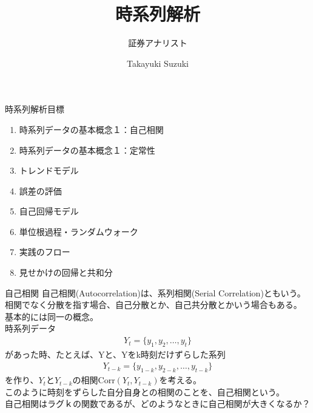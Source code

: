 \documentclass[dvipdfmx,autodetect-engine, unicode, 10pt, aspectratio=169]{beamer}
\title{時系列解析}
\subtitle{証券アナリスト}
\date{}
\author{Takayuki Suzuki}
\institute{This is institude of the author}
\begin{document}
\maketitle


\begin{frame}{時系列解析目標}
    \begin{enumerate}
        \item 時系列データの基本概念１：自己相関
        \item 時系列データの基本概念１：定常性
        \item トレンドモデル
        \item 誤差の評価
        \item 自己回帰モデル
        \item 単位根過程・ランダムウォーク
        \item 実践のフロー
        \item 見せかけの回帰と共和分
    \end{enumerate}
\end{frame}



\begin{frame}{自己相関}
    自己相関(Autocorrelation)は、系列相関(Serial Correlation)ともいう。\\
    相関でなく分散を指す場合、自己分散とか、自己共分散とかいう場合もある。\\
    基本的には同一の概念。\\
    時系列データ
    \begin{align*}
        Y_t =  \{ y_1, y_2, \dotsc , y_t \}
    \end{align*}
    があった時、たとえば、Yと、Yをk時刻だけずらした系列
    \begin{align*}
        Y_{t-k} =  \{ y_{1-k}, y_{2-k}, \dotsc , y_{t-k} \}
    \end{align*}
    を作り、$Y_t$と$Y_{t-k}$の相関$\text{Corr}(Y_t, Y_{t-k})$を考える。\\
    このように時刻をずらした自分自身との相関のことを、自己相関という。\\
    自己相関はラグｋの関数であるが、どのようなときに自己相関が大きくなるか？ 
\end{frame}
\end{document}
